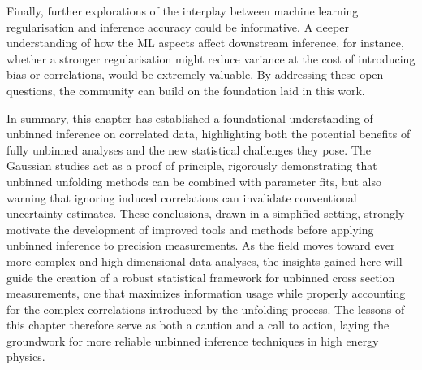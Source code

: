    Finally, further explorations of the interplay between machine learning regularisation and inference accuracy could be informative.
    A deeper understanding of how the ML aspects affect downstream inference, for instance, whether a stronger regularisation might reduce variance at the cost of introducing bias or correlations, would be extremely valuable.
    By addressing these open questions, the community can build on the foundation laid in this work.

    In summary, this chapter has established a foundational understanding of unbinned inference on correlated data, highlighting both the potential benefits of fully unbinned analyses and the new statistical challenges they pose.
    The Gaussian studies act as a proof of principle, rigorously demonstrating that unbinned unfolding methods can be combined with parameter fits, but also warning that ignoring induced correlations can invalidate conventional uncertainty estimates.
    These conclusions, drawn in a simplified setting, strongly motivate the development of improved tools and methods before applying unbinned inference to precision measurements.
    As the field moves toward ever more complex and high-dimensional data analyses, the insights gained here will guide the creation of a robust statistical framework for unbinned cross section measurements, one that maximizes information usage while properly accounting for the complex correlations introduced by the unfolding process.
    The lessons of this chapter therefore serve as both a caution and a call to action, laying the groundwork for more reliable unbinned inference techniques in high energy physics.
